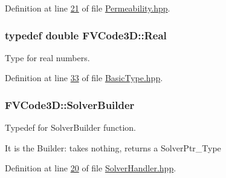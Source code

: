 Definition at line \hyperlink{Permeability_8hpp_source_l00021}{21} of file \hyperlink{Permeability_8hpp_source}{Permeability.\+hpp}.

\subsubsection[{\texorpdfstring{Real}{Real}}]{\setlength{\rightskip}{0pt plus 5cm}typedef double {\bf F\+V\+Code3\+D\+::\+Real}}\hypertarget{namespaceFVCode3D_a40c1f5588a248569d80aa5f867080e83}{}\label{namespaceFVCode3D_a40c1f5588a248569d80aa5f867080e83}


Type for real numbers. 



Definition at line \hyperlink{BasicType_8hpp_source_l00033}{33} of file \hyperlink{BasicType_8hpp_source}{Basic\+Type.\+hpp}.

\subsubsection[{\texorpdfstring{Solver\+Builder}{SolverBuilder}}]{\setlength{\rightskip}{0pt plus 5cm}F\+V\+Code3\+D\+::\+Solver\+Builder}\hypertarget{namespaceFVCode3D_ae1d65e23bd2373e382d1f397337de344}{}\label{namespaceFVCode3D_ae1d65e23bd2373e382d1f397337de344}


Typedef for Solver\+Builder function. 

It is the Builder\+: takes nothing, returns a Solver\+Ptr\+\_\+\+Type 

Definition at line \hyperlink{SolverHandler_8hpp_source_l00020}{20} of file \hyperlink{SolverHandler_8hpp_source}{Solver\+Handler.\+hpp}.

\subsubsection[{\texorpdfstring{Solver\+Ptr\+\_\+\+Type}{SolverPtr_Type}}]{}\hypertarget{namespaceFVCode3D_a0b32227a4e5847c2fb27215fb81d9363}{}\label{namespaceFVCode3D_a0b32227a4e5847c2fb27215fb81d9363}


